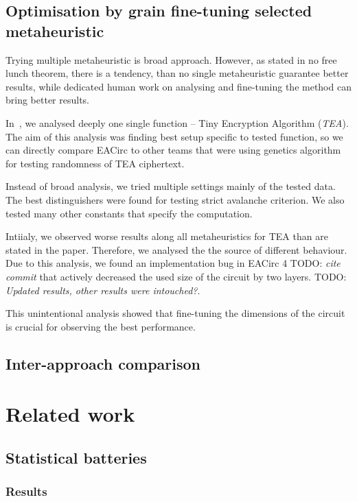 \documentclass[
  print, %
  Table,   %
  nolof,     %
  nolot,     %
  11pt, %
  oneside  %
]{fithesis3}
\newcommand{\todo}[1]{TODO: \textit{#1}}
\begin{document}
\section{Optimisation by grain fine-tuning selected metaheuristic}
\label{sec:res-finetuning}

Trying multiple metaheuristic is broad approach. However, as stated in no free lunch theorem, there is a tendency, than no single metaheuristic guarantee better results, while dedicated human work on analysing and fine-tuning the method can bring better results.

In~\cite{kubicek2016new}, we analysed deeply one single function -- Tiny Encryption Algorithm (\textit{TEA}). The aim of this analysis was finding best setup specific to tested function, so we can directly compare EACirc to other teams that were using genetics algorithm for testing randomness of TEA ciphertext.

Instead of broad analysis, we tried multiple settings mainly of the tested data. The best distinguishers were found for testing strict avalanche criterion. We also tested many other constants that specify the computation.

Intiialy, we observed worse results along all metaheuristics for TEA than are stated in the paper. Therefore, we analysed the the source of different behaviour. Due to this analysis, we found an implementation bug in EACirc 4 \todo{cite commit} that actively decreased the used size of the circuit by two layers. \todo{Updated results, other results were intouched?}.

This unintentional analysis showed that fine-tuning the dimensions of the circuit is crucial for observing the best performance.

\section{Inter-approach comparison}
\label{sec:res-comp}


\chapter{Related work}
\label{chap:relatwork}

\section{Statistical batteries}
\label{sec:relatwork-stat}

\subsection{Results}
\label{subsec:relatwork-stat-res}
\end{document}
